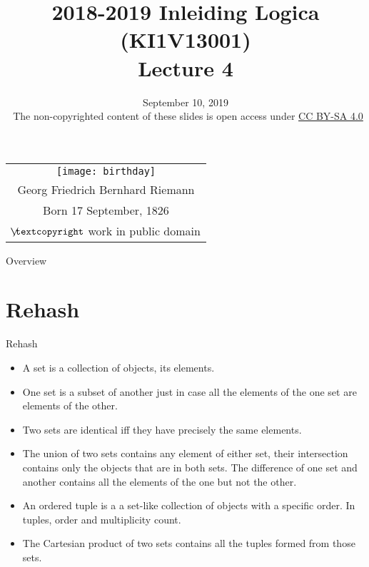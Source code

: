 \documentclass[../slides.tex]{subfiles}
\title{2018-2019 Inleiding Logica (KI1V13001) \\ Lecture 4}
\date{September 10, 2019\\[2ex] {\tiny \textcopyright~The non-copyrighted content of these slides is open access under \href{https://creativecommons.org/licenses/by-sa/4.0/}{CC BY-SA 4.0}}}
\begin{document}
\setcounter{framenumber}{97}
\begin{frame}
	\maketitle
\end{frame}

\begin{frame}
\begin{center}
			\begin{tabular}{c}
			 	\texttt{[image: birthday]}\\
				Georg Friedrich Bernhard Riemann\\
				Born 17 September, 1826\\
				{\tiny $\not\hspace{-1ex}\textcopyright$ work in public domain} 
			\end{tabular}
		\end{center}	

\end{frame}

\begin{frame}{Overview}
\tableofcontents
\end{frame}

\section{Rehash}
\begin{frame}{Rehash}
	
\begin{itemize}

		\item A set is a collection of objects, its elements.
		
		\item One set is a subset of another just in case all the elements of the one set are elements of the other. 
				
		\item Two sets are identical iff they have precisely the same elements. 
		
		\item The union of two sets contains any element of either set, their intersection contains only the objects that are in both sets. The difference of one set and another contains all the elements of the one but not the other.
		
		\item An ordered tuple is a a set-like collection of objects with a specific order. In tuples, order and multiplicity count.
		
		\item The Cartesian product of two sets contains all the tuples formed from those sets.
		
		\end{itemize}
		
	\end{frame}
		
\end{document}
